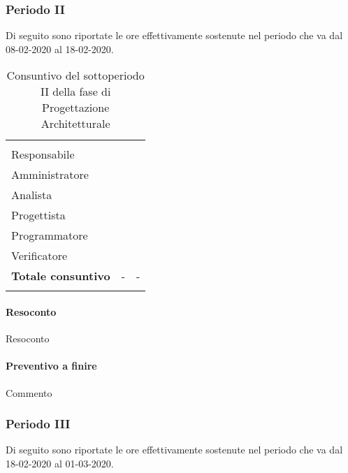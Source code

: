 \subsubsection{Periodo II}

Di seguito sono riportate le ore effettivamente sostenute nel periodo che va dal 08-02-2020 al 18-02-2020.

\begin{longtable}{ C{4cm} C{3cm} C{3.5cm}} 
 	 &
 	 &
 	 \\
 	
 	Responsabile &  & \\
 	Amministratore &  & \\
 	Analista & & \\
 	Progettista & & \\
 	Programmatore & &\\
 	Verificatore & & \\
 	
	\hline 	
 	
 	\textbf{Totale consuntivo} &
	- \color{coloreRosso}{\textbf{(+--)}} &
 	- \\	
 	
 	\caption{Consuntivo del sottoperiodo II della fase di Progettazione Architetturale}
\end{longtable}

\vspace{-1cm}

\paragraph{Resoconto}
Resoconto
\paragraph{Preventivo a finire}
Commento

\subsubsection{Periodo III}

Di seguito sono riportate le ore effettivamente sostenute nel periodo che va dal 18-02-2020 al 01-03-2020.

